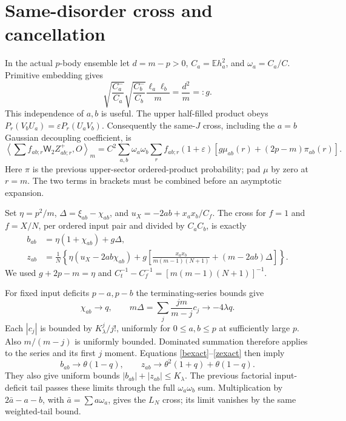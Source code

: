 \documentclass[11pt,a4paper]{article}
\newcommand{\EE}{\mathbb E}
\newcommand{\W}{\mathsf W_2}
\begin{document}
\newpage
\section{Same-disorder cross and cancellation}
In the actual $p$-body ensemble let $d=m-p>0$, $C_a=\EE h_a^2$,
and $\omega_a=C_a/C$. Primitive embedding gives
\begin{equation}
 \sqrt{\frac{C_a^-}{C_a}}\sqrt{\frac{C_b^-}{C_b}}
       \frac{\ell_a\ell_b}{m}=\frac{d^2}{m}=:g.
\end{equation}
This independence of $a,b$ is useful. The upper half-filled product
obeys $P_r(V_bU_a)=\varepsilon P_r(U_aV_b)$.
Consequently the same-$J$ cross, including the $a=b$ Gaussian
decoupling coefficient, is
\begin{equation}
 \left\langle\sum f_{ab;r}\W Z^+_{ab;r},O\right\rangle_m
 =C^2\sum_{a,b}\omega_a\omega_b\sum_r f_{ab;r}(1+\varepsilon)
       [g\mu_{ab}(r)+(2p-m)\pi_{ab}(r)].\label{cross}
\end{equation}
Here $\pi$ is the previous upper-sector ordered-product probability;
pad $\mu$ by zero at $r=m$. The two terms in brackets must be
combined before an asymptotic expansion.

Set $\eta=p^2/m$, $\Delta=\xi_{ab}-\chi_{ab}$, and
$u_X=-2ab+x_ax_b/C_f$. The cross for $f=1$ and $f=X/N$,
per ordered input pair and divided by $C_aC_b$, is exactly
\begin{align}
 b_{ab}&=\eta(1+\chi_{ab})+g\Delta,\label{bexact}\\
 z_{ab}&=\frac1N\left\{
 \eta(u_X-2ab\chi_{ab})+
 g\left[\frac{x_ax_b}{m(m-1)(N+1)}+(m-2ab)\Delta\right]
 \right\}.\label{zexact}
\end{align}
We used $g+2p-m=\eta$ and
$C_t^{-1}-C_f^{-1}=[m(m-1)(N+1)]^{-1}$.

For fixed input deficits $p-a,p-b$ the terminating-series bounds
give
\begin{equation}
 \chi_{ab}\to q,\qquad
 m\Delta=\sum_j\frac{jm}{m-j}c_j\to-4\lambda q.
\end{equation}
Each $|c_j|$ is bounded by $K_\lambda^j/j!$, uniformly for
$0\leq a,b\leq p$ at sufficiently large $p$. Also $m/(m-j)$ is
uniformly bounded. Dominated summation therefore applies to the
series and its first $j$ moment. Equations \eqref{bexact}--\eqref{zexact}
then imply
\begin{equation}
 b_{ab}\to\theta(1-q),\qquad
 z_{ab}\to\theta^2(1+q)+\theta(1-q).
\end{equation}
They also give uniform bounds $|b_{ab}|+|z_{ab}|\leq K_\lambda$.
The previous factorial input-deficit tail passes these limits through
the full $\omega_a\omega_b$ sum. Multiplication by
$2\bar a-a-b$, with $\bar a=\sum a\omega_a$, gives the $L_N$ cross;
its limit vanishes by the same weighted-tail bound.
\end{document}
